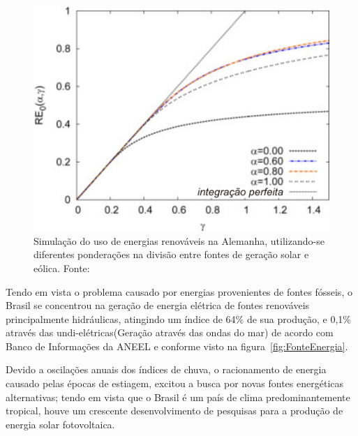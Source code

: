 \FloatBarrier
\begin{figure}[htbp]
	\centering
	\includegraphics[scale=1.5]{imagens/wind_solar}
	\caption{Simulação do uso de energias renováveis na Alemanha, utilizando-se diferentes ponderações na divisão entre fontes de geração solar e eólica. Fonte:   }
	
	\label{fig:Wind_sol}
\end{figure}
\FloatBarrier

Tendo em vista o problema causado por energias provenientes de fontes fósseis, o Brasil se concentrou na geração de energia elétrica de fontes renováveis principalmente hidráulicas, atingindo um índice de 64\% de sua produção, e 0,1\% através das undi-elétricas(Geração através das ondas do mar) de acordo com Banco de Informações da ANEEL e conforme visto na figura~\ref{fig:FonteEnergia}.

Devido a oscilações anuais dos índices de chuva, o racionamento de energia causado pelas épocas de estiagem, excitou a busca por novas fontes energéticas alternativas; tendo em vista que o Brasil é um país de clima predominantemente tropical, houve um crescente  desenvolvimento de pesquisas para a produção de energia solar fotovoltaica. 

